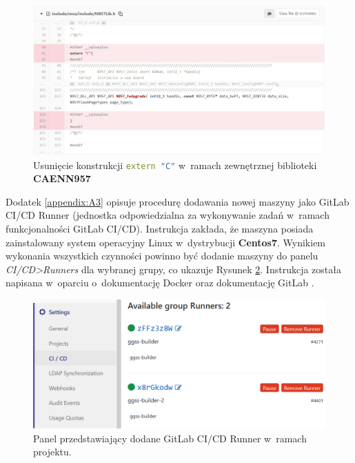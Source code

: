 \begin{figure}
\includegraphics[width=\textwidth]{res/png/removeExternC}
\caption{Usunięcie konstrukcji \lstinline[language=c++]{extern "C"} w~ramach zewnętrznej biblioteki \textbf{CAENN957}}
\label{fig:removeExternC}
\end{figure}

\onecolumn




\newpage





Dodatek \ref{appendix:A3} opisuje procedurę dodawania nowej maszyny jako GitLab CI/CD Runner (jednostka odpowiedzialna za wykonywanie zadań w~ramach funkcjonalności GitLab CI/CD). Instrukcja zakłada, że maszyna posiada zainstalowany system operacyjny Linux w~dystrybucji \textbf{Centos7}. Wynikiem wykonania wszystkich czynności powinno być dodanie maszyny do panelu \textit{CI/CD>Runners} dla wybranej grupy, co ukazuje Rysunek \ref{fig:runner}. Instrukcja została napisana w~oparciu o~dokumentację Docker \cite{DockerInstall} oraz dokumentację GitLab \cite{RunnerRegister}.

\begin{figure}
\includegraphics[width=\textwidth]{res/png/runnerAdded}
\caption{Panel przedstawiający dodane GitLab CI/CD Runner w~ramach projektu.}
\label{fig:runner}
\end{figure}
